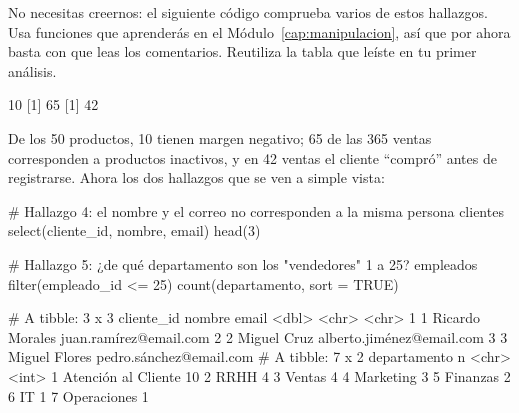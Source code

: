 No necesitas creernos: el siguiente código comprueba varios de estos
hallazgos. Usa funciones que aprenderás en el
Módulo~\ref{cap:manipulacion}, así que por ahora basta con que leas los
comentarios. Reutiliza la tabla  que leíste en tu primer
análisis.


\begin{rsalida}
[1] 10
[1] 65
[1] 42
\end{rsalida}

De los 50 productos, 10 tienen margen negativo; 65 de las 365 ventas
corresponden a productos inactivos, y en 42 ventas el cliente ``compró''
antes de registrarse. Ahora los dos hallazgos que se ven a simple vista:

\begin{rcode}
# Hallazgo 4: el nombre y el correo no corresponden a la misma persona
clientes %
  select(cliente_id, nombre, email) %
  head(3)

# Hallazgo 5: ¿de qué departamento son los "vendedores" 1 a 25?
empleados %
  filter(empleado_id <= 25) %
  count(departamento, sort = TRUE)
\end{rcode}

\begin{rsalida}
# A tibble: 3 x 3
  cliente_id nombre          email
       <dbl> <chr>           <chr>
1          1 Ricardo Morales juan.ramírez@email.com
2          2 Miguel Cruz     alberto.jiménez@email.com
3          3 Miguel Flores   pedro.sánchez@email.com
# A tibble: 7 x 2
  departamento            n
  <chr>               <int>
1 Atención al Cliente    10
2 RRHH                    4
3 Ventas                  4
4 Marketing               3
5 Finanzas                2
6 IT                      1
7 Operaciones             1
\end{rsalida}

